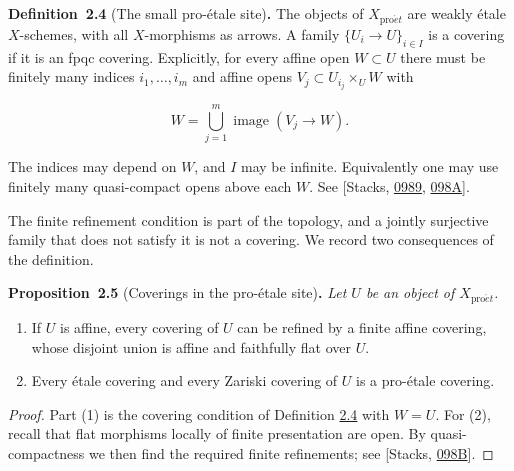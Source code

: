 \documentclass[11pt]{article}
\newenvironment{bpstatement}[2]{\par\addvspace{0.6\baselineskip}\noindent\textbf{#1}#2\textbf{.}\enspace\ignorespaces}
  {\par\addvspace{0.4\baselineskip}}
\newenvironment{bpstatementit}[2]{\begin{bpstatement}{#1}{#2}\itshape\ignorespaces}{\end{bpstatement}}
\begin{document}
\label{bp12}%
\begin{bpstatement}{Definition~2.4}{ (The small pro-étale site)}
The objects of \(X_{\mathrm{pro}\acute{e}t}\) are weakly étale \(X\)-schemes, with all \(X\)-morphisms as arrows. A family \(\{U_i\to U\}_{i\in I}\) is a covering if it is an fpqc covering. Explicitly, for every affine open \(W\subset U\) there must be finitely many indices \(i_1,\ldots,i_m\) and affine opens \(V_j\subset U_{i_j}\times_UW\) with

\[
W=\bigcup_{j=1}^m\operatorname{image}(V_j\to W).
\]

The indices may depend on \(W\), and \(I\) may be infinite. Equivalently one may use finitely many quasi-compact opens above each \(W\). See [Stacks, \href{https://stacks.math.columbia.edu/tag/0989}{0989}, \href{https://stacks.math.columbia.edu/tag/098A}{098A}].
\end{bpstatement}

\label{bp13}%
The finite refinement condition is part of the topology, and a jointly surjective family that does not satisfy it is not a covering. We record two consequences of the definition.

\label{bp14}%
\begin{bpstatementit}{Proposition~2.5}{ (Coverings in the pro-étale site)}
Let \(U\) be an object of \(X_{\mathrm{pro}\acute{e}t}\).

\begin{enumerate}
\item If \(U\) is affine, every covering of \(U\) can be refined by a finite affine covering, whose disjoint union is affine and faithfully flat over \(U\).
\item Every étale covering and every Zariski covering of \(U\) is a pro-étale covering.
\end{enumerate}
\end{bpstatementit}

\begin{proof}[{Proof}]\label{bp15}%
Part (1) is the covering condition of Definition \hyperref[bp12]{2.4} with \(W=U\). For (2), recall that flat morphisms locally of finite presentation are open. By quasi-compactness we then find the required finite refinements; see [Stacks, \href{https://stacks.math.columbia.edu/tag/098B}{098B}].
\end{proof}
\end{document}
